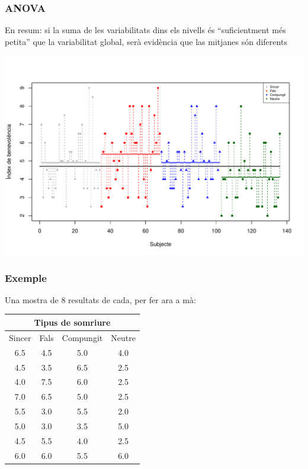 \documentclass[12pt,t]{beamer}
\theoremstyle{plain}
\theoremstyle{definition}
\begin{document}
\begin{frame}
\frametitle{ANOVA}\vspace*{-1ex}

En resum: si la suma de les variabilitats dins els nivells és ``suficientment més petita'' que la variabilitat global, serà  evidència  que las mitjanes són diferents\pause\vspace*{-1ex}

\begin{center}
{\includegraphics[width=\linewidth]{plotsmilecomplet2}}
\end{center}

\end{frame}



\begin{frame}
\frametitle{Exemple}

Una mostra de 8 resultats de cada, per fer ara a mà:
\begin{center}
\begin{tabular}{cccc}
\multicolumn{4}{c}{Tipus de somriure}\\\hline
Sincer & Fals & Compungit & Neutre\\\hline
6.5 &4.5 &  5.0  &  4.0 \\
4.5 &3.5 & 6.5  &  2.5  \\
4.0 &7.5 & 6.0  &  2.5  \\
7.0  &6.5 & 5.0  &  2.5  \\
5.5 & 3.0 & 5.5  & 2.0  \\
5.0  &3.0 & 3.5  &  5.0  \\
4.5  &5.5 & 4.0  & 2.5  \\
6.0 & 6.0 &5.5  &6.0   
\end{tabular}
\end{center}
\end{frame}
\end{document}
